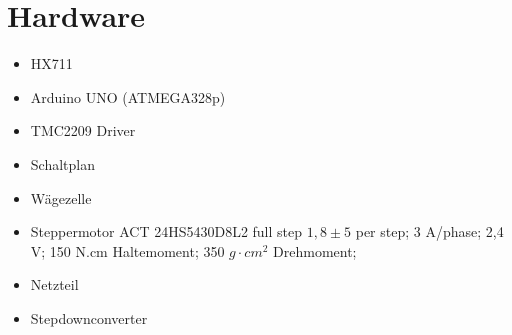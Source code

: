 \section{Hardware}
\label{sec:Hardware}



\begin{itemize}
    \item HX711
    \item Arduino UNO (ATMEGA328p)
    \item TMC2209 Driver
    \item Schaltplan
    \item Wägezelle
    \item Steppermotor ACT 24HS5430D8L2
    full step $1,8 \pm 5$ per step;
    3 A/phase;
    2,4 V;
    150 N.cm Haltemoment;
    350 $g \cdot cm^2$ Drehmoment;
    \item Netzteil
    \item Stepdownconverter
\end{itemize}










